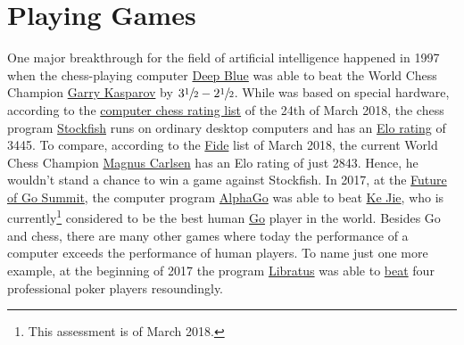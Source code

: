\chapter{Playing Games}
One major breakthrough for the field of artificial intelligence happened in 1997 when the chess-playing computer
\href{https://en.wikipedia.org/wiki/Deep_Blue_(chess_computer)}{Deep Blue} was able to beat the World Chess
Champion \href{https://en.wikipedia.org/wiki/Garry_Kasparov}{Garry Kasparov} by $3\sfrac{1}{2}-2\sfrac{1}{2}$.
While  was based on special hardware, according to the
\href{http://www.computerchess.org.uk/ccrl/4040/rating_list_all.html}{computer chess rating list} of the 24th
of March 2018, the chess program \href{https://en.wikipedia.org/wiki/Stockfish_(chess)}{Stockfish} runs
on ordinary desktop computers and has an \href{https://en.wikipedia.org/wiki/Elo_rating_system}{Elo rating} of 3445.  
To compare, according to the
\href{https://ratings.fide.com/top.phtml?list=men}{Fide} list of March 2018, the current 
World Chess Champion \href{https://en.wikipedia.org/wiki/Magnus_Carlsen}{Magnus Carlsen} has an Elo rating of
just 2843.  Hence, he wouldn't stand a chance to win a game against Stockfish.  In 2017, at the 
\href{https://en.wikipedia.org/wiki/Future_of_Go_Summit}{Future of Go Summit},  the computer program
\href{https://en.wikipedia.org/wiki/AlphaGo}{AlphaGo} was able to beat
\href{https://en.wikipedia.org/wiki/Ke_Jie}{Ke Jie}, who is currently\footnote{This assessment is of March 2018.} 
considered to be the best human \href{https://en.wikipedia.org/wiki/Go_(game)}{Go} player in the world.
Besides Go and chess, there are many other games where today the performance of a computer exceeds the
performance of human players.  To name just one more example, at the beginning of 2017 the program
\href{https://en.wikipedia.org/wiki/Libratus}{Libratus} was able to  
\href{https://www.engadget.com/2017/01/31/libratus-the-poker-playing-ai-destroyed-its-four-human-rivals/}{beat}
four professional poker players resoundingly.

